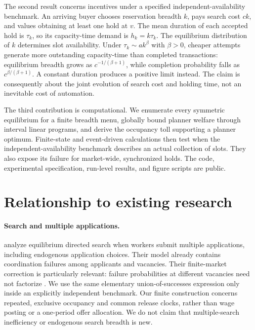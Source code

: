 \documentclass[11pt,a4paper]{article}
\begin{document}
The second result concerns incentives under a specified independent-availability benchmark. An arriving buyer chooses reservation breadth $k$, pays search cost $ck$, and values obtaining at least one hold at $v$. The mean duration of each accepted hold is $\tau_k$, so its capacity-time demand is $h_k=k\tau_k$. The equilibrium distribution of $k$ determines slot availability. Under $\tau_k\sim a k^\beta$ with $\beta>0$, cheaper attempts generate more outstanding capacity-time than completed transactions: equilibrium breadth grows as $c^{-1/(\beta+1)}$, while completion probability falls as $c^{\beta/(\beta+1)}$. A constant duration produces a positive limit instead. The claim is consequently about the joint evolution of search cost and holding time, not an inevitable cost of automation.

The third contribution is computational. We enumerate every symmetric equilibrium for a finite breadth menu, globally bound planner welfare through interval linear programs, and derive the occupancy toll supporting a planner optimum. Finite-state and event-driven calculations then test when the independent-availability benchmark describes an actual collection of slots. They also expose its failure for market-wide, synchronized holds. The code, experimental specification, run-level results, and figure scripts are public.

\section{Relationship to existing research}
\paragraph{Search and multiple applications.}
\citet{albrecht} analyze equilibrium directed search when workers submit multiple applications, including endogenous application choices. Their model already contains coordination failures among applicants and vacancies. Their finite-market correction is particularly relevant: failure probabilities at different vacancies need not factorize \citep{correction}. We use the same elementary union-of-successes expression only inside an explicitly independent benchmark. Our finite construction concerns repeated, exclusive occupancy and common release clocks, rather than wage posting or a one-period offer allocation. We do not claim that multiple-search inefficiency or endogenous search breadth is new.
\end{document}
